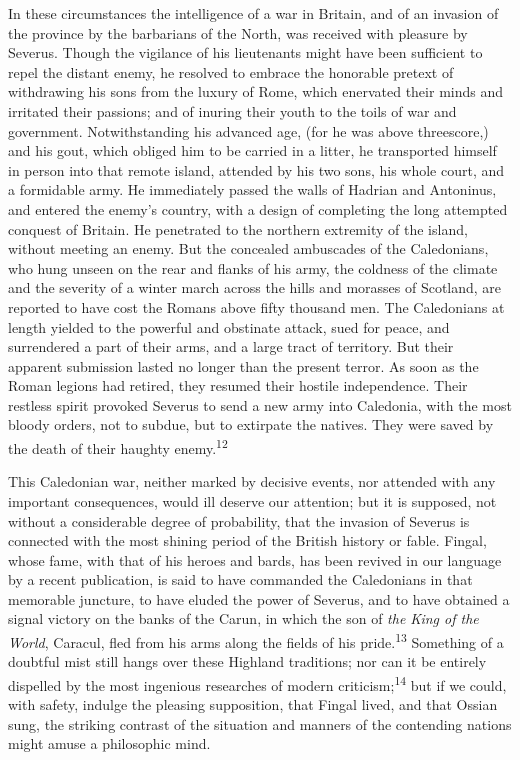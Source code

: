 In these circumstances the intelligence of a war in Britain, and
of an invasion of the province by the barbarians of the North,
was received with pleasure by Severus. Though the vigilance of
his lieutenants might have been sufficient to repel the distant
enemy, he resolved to embrace the honorable pretext of
withdrawing his sons from the luxury of Rome, which enervated
their minds and irritated their passions; and of inuring their
youth to the toils of war and government. Notwithstanding his
advanced age, (for he was above threescore,) and his gout, which
obliged him to be carried in a litter, he transported himself in
person into that remote island, attended by his two sons, his
whole court, and a formidable army. He immediately passed the
walls of Hadrian and Antoninus, and entered the enemy’s country,
with a design of completing the long attempted conquest of
Britain. He penetrated to the northern extremity of the island,
without meeting an enemy. But the concealed ambuscades of the
Caledonians, who hung unseen on the rear and flanks of his army,
the coldness of the climate and the severity of a winter march
across the hills and morasses of Scotland, are reported to have
cost the Romans above fifty thousand men. The Caledonians at
length yielded to the powerful and obstinate attack, sued for
peace, and surrendered a part of their arms, and a large tract of
territory. But their apparent submission lasted no longer than
the present terror. As soon as the Roman legions had retired,
they resumed their hostile independence. Their restless spirit
provoked Severus to send a new army into Caledonia, with the most
bloody orders, not to subdue, but to extirpate the natives. They
were saved by the death of their haughty enemy.\textsuperscript{12}


This Caledonian war, neither marked by decisive events, nor
attended with any important consequences, would ill deserve our
attention; but it is supposed, not without a considerable degree
of probability, that the invasion of Severus is connected with
the most shining period of the British history or fable. Fingal,
whose fame, with that of his heroes and bards, has been revived
in our language by a recent publication, is said to have
commanded the Caledonians in that memorable juncture, to have
eluded the power of Severus, and to have obtained a signal
victory on the banks of the Carun, in which the son of \textit{the King
of the World}, Caracul, fled from his arms along the fields of
his pride.\textsuperscript{13} Something of a doubtful mist still hangs over these
Highland traditions; nor can it be entirely dispelled by the most
ingenious researches of modern criticism;\textsuperscript{14} but if we could,
with safety, indulge the pleasing supposition, that Fingal lived,
and that Ossian sung, the striking contrast of the situation and
manners of the contending nations might amuse a philosophic mind.

